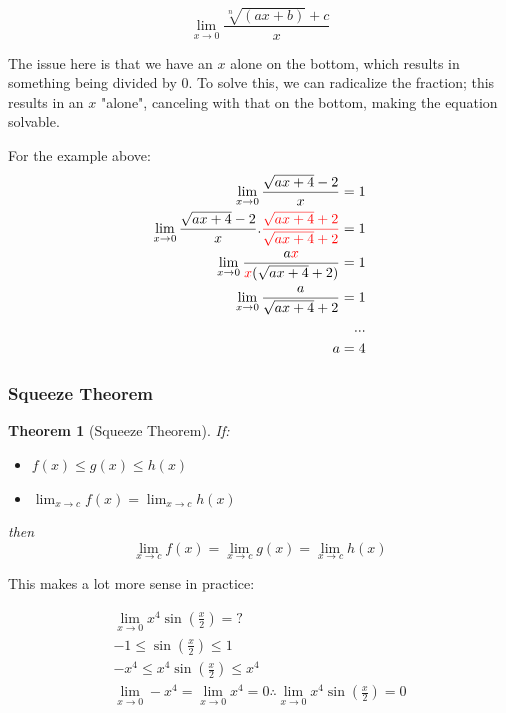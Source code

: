 \documentclass[12pt]{article}
\newtheorem*{theorem}{Theorem}
\begin{document}
$$\lim_{x\to 0}\frac{\sqrt[n]{(ax+b)} + c}{x}$$

The issue here is that we have an $x$ alone on the bottom, which results in something being divided by 0. To solve this, we can radicalize the fraction; this results in an $x$ "alone", canceling with that on the bottom, making the equation solvable.

For the example above:
\begin{equation}
\begin{split}
    \lim_{x\to0} \frac{\sqrt{ax + 4} - 2}{x} = 1\\
    \lim_{x\to0} \frac{\sqrt{ax + 4} - 2}{x}.\textcolor{red}{\frac{\sqrt{ax + 4} + 2}{\sqrt{ax + 4} + 2}} = 1\\
    \lim_{x\to0} \frac{a\textcolor{red}{x}}{\textcolor{red}{x}(\sqrt{ax+4}+2)} = 1\\
    \lim_{x\to 0} \frac{a}{\sqrt{ax + 4} + 2} = 1\\
    ...\\
    a = 4
\end{split}
\end{equation}
\subsubsection{Squeeze Theorem}

\begin{theorem}[Squeeze Theorem]
If: 
    \begin{itemize}
        \item $f(x) \leq g(x) \leq h(x)$ 

        \item $\lim_{x \to c} f(x) = \lim_{x \to c} h(x)$

    \end{itemize}
then \[\lim_{x\to c} f(x) = \lim_{x \to c} g(x) = \lim_{x \to c} h(x)\]
\end{theorem}

This makes a lot more sense in practice:

\begin{equation}
    \begin{split}
        \lim_{x\to0} x^4 \sin(\frac{x}{2}) = ?\\
        -1 \leq \sin(\frac{x}{2}) \leq 1\\
        -x^4 \leq x^4 \sin(\frac{x}{2}) \leq x^4\\
        \lim_{x\to 0} -x^4 = \lim_{x\to 0} x^4 = 0 \therefore \lim_{x\to0} x^4 \sin(\frac{x}{2}) = 0
    \end{split}
\end{equation}
\end{document}
